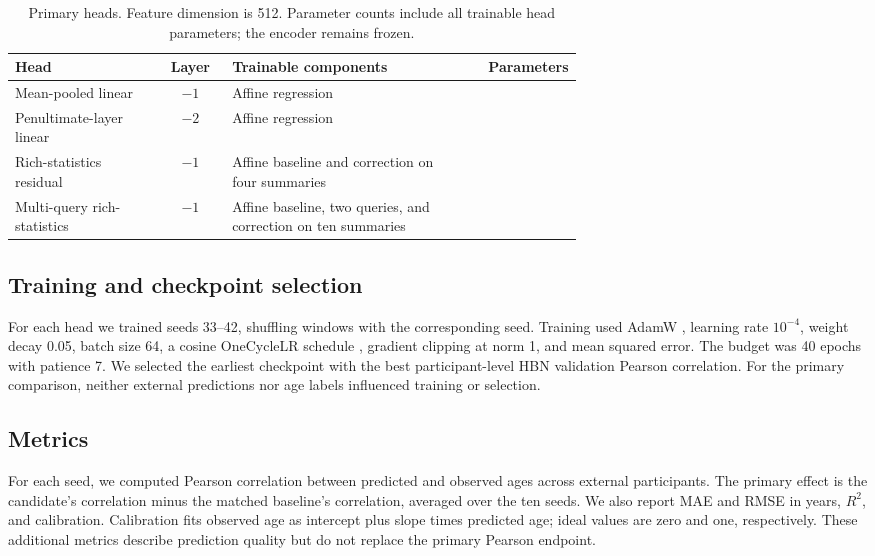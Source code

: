 \begin{table}[tbp]
  \centering
  \small
  \caption{Primary heads. Feature dimension is 512. Parameter counts include
  all trainable head parameters; the encoder remains frozen.}
  \label{tab:heads}
  \begin{tabular}{p{0.26\linewidth}cp{0.40\linewidth}r}
  \toprule
  Head & Layer & Trainable components & Parameters \\
  \midrule
  Mean-pooled linear & $-1$ & Affine regression & \BaselineParameters{} \\
  Penultimate-layer linear & $-2$ & Affine regression & \LayerParameters{} \\
  Rich-statistics residual & $-1$ & Affine baseline and correction on four summaries & \RichParameters{} \\
  Multi-query rich-statistics & $-1$ & Affine baseline, two queries, and correction on ten summaries & \QueryParameters{} \\
  \bottomrule
  \end{tabular}
\end{table}

\subsection{Training and checkpoint selection}
For each head we trained seeds 33--42, shuffling windows with the corresponding
seed. Training used AdamW \citep{loshchilov2019adamw}, learning rate $10^{-4}$,
weight decay 0.05, batch size 64, a cosine OneCycleLR schedule
\citep{smith2018superconvergence}, gradient clipping at norm 1, and mean squared
error. The budget was 40 epochs with patience 7. We selected the earliest
checkpoint with the best participant-level HBN validation Pearson correlation.
For the primary comparison, neither external predictions nor age labels
influenced training or selection.

\subsection{Metrics}
For each seed, we computed Pearson correlation between predicted and observed
ages across external participants. The primary effect is the candidate's
correlation minus the matched baseline's correlation, averaged over the ten
seeds. We also report MAE and RMSE in years, $R^2$, and calibration. Calibration
fits observed age as intercept plus slope times predicted age; ideal values
are zero and one, respectively. These additional metrics describe prediction
quality but do not replace the primary Pearson endpoint.

